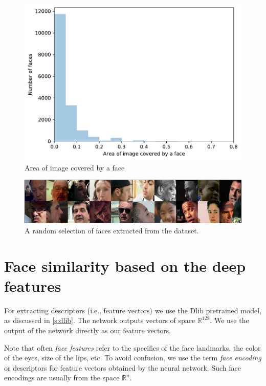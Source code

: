 
\begin{figure}
    \centering
    \includegraphics[width=0.7\linewidth]{graphs/faces_size_distribution.pdf}
    \caption{Area of image covered by a face}
    \label{fig:faces_size_distribution}
\end{figure}

\begin{figure}
    \centering
    \includegraphics[width=0.98\linewidth]{img/random_selection_faces.pdf}
    \caption{A random selection of faces extracted from the dataset.}
    \label{fig:random_selection_faces}
\end{figure}

\section{Face similarity based on the deep features}

For extracting descriptors (i.e., feature vectors) we use the Dlib pretrained model, as discussed in \ref{s:dlib}. The network outputs vectors of space $\mathbb{R}^{128}$. We use the output of the network directly as our feature vectors. 

Note that often \emph{face features} refer to the specifics of the face landmarks, the color of the eyes, size of the lips, etc. To avoid confusion, we use the term \emph{face encoding} or descriptors for feature vectors obtained by the neural network. Such face encodings are usually from the space $\mathbb{R}^n$.

